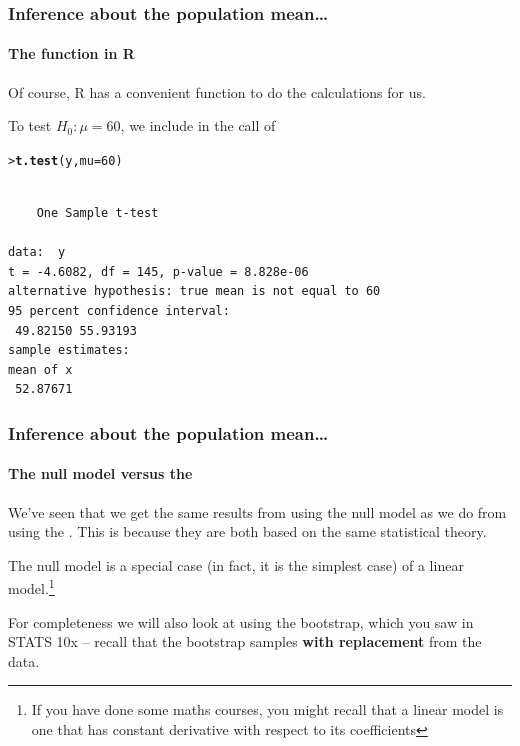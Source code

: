 \documentclass{beamer}\usepackage[]{graphicx}\usepackage[]{xcolor}
\makeatletter
\newcommand{\hlnum}[1]{\textcolor[rgb]{0.686,0.059,0.569}{#1}}%
\newcommand{\hlstd}[1]{\textcolor[rgb]{0.345,0.345,0.345}{#1}}%
\newcommand{\hlkwc}[1]{\textcolor[rgb]{0.333,0.667,0.333}{#1}}%
\newcommand{\hlkwd}[1]{\textcolor[rgb]{0.737,0.353,0.396}{\textbf{#1}}}%
\newenvironment{kframe}{%
 \def\at@end@of@kframe{}%
 \ifinner\ifhmode%
  \def\at@end@of@kframe{\end{minipage}}%
  \begin{minipage}{\columnwidth}%
 \fi\fi%
 \def\FrameCommand##1{\hskip\@totalleftmargin \hskip-\fboxsep
 \colorbox{shadecolor}{##1}\hskip-\fboxsep
     \hskip-\linewidth \hskip-\@totalleftmargin \hskip\columnwidth}%
 \MakeFramed {\advance\hsize-\width
   \@totalleftmargin\z@ \linewidth\hsize
   \@setminipage}}%
 {\par\unskip\endMakeFramed%
 \at@end@of@kframe}
\newenvironment{knitrout}{}{} %
\makeatother
\begin{document}
\begin{frame}[fragile]
\frametitle{Inference about the population mean\ldots}
\framesubtitle{The  function in R} 
Of course, R has a convenient function to do the \ttest{} calculations for us.

To test $H_0: \mu=60$, we include  in the call of 

\begin{knitrout}\scriptsize
{}\color{fgcolor}\begin{kframe}
\begin{alltt}
\hlstd{> }\hlkwd{t.test}\hlstd{(y,}\hlkwc{mu}\hlstd{=}\hlnum{60}\hlstd{)}
\end{alltt}
\begin{verbatim}

	One Sample t-test

data:  y
t = -4.6082, df = 145, p-value = 8.828e-06
alternative hypothesis: true mean is not equal to 60
95 percent confidence interval:
 49.82150 55.93193
sample estimates:
mean of x 
 52.87671 
\end{verbatim}
\end{kframe}
\end{knitrout}
\end{frame}



\begin{frame}[fragile]
\frametitle{Inference about the population mean\ldots}
\framesubtitle{The null model versus the \ttest{}} 

We've seen that we get the same results from using the null model as we do from using the \ttest{}. This is because they are both based on the same statistical theory.
\medskip

The null model is a special case (in fact, it is the simplest case) of a linear model.\footnote{If you have done some maths courses, you might recall that a linear model is one that has constant derivative with respect to its coefficients} 

\medskip
For completeness we will also look at using the bootstrap, 
which you saw in STATS 10x --
recall that the bootstrap samples {\bf with replacement} from the data.
\end{frame}

\end{document}
